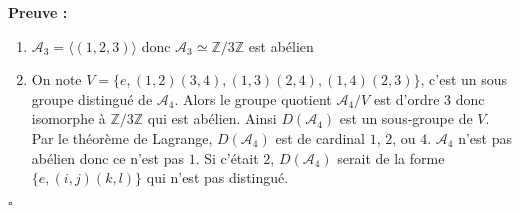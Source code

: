 \documentclass{report}
\renewenvironment{leftbar}{%
  \def\FrameCommand{\vrule width 0.4pt \hspace{10pt}}%
  \MakeFramed {\advance\hsize-\width \FrameRestore}}%
 {\endMakeFramed}%
\newenvironment{preuve}{\vspace*{0.5cm}
    \begin{leftbar}
    \noindent\textbf{Preuve :}\par}{
    \begin{flushright}
    $\square$
    \end{flushright}
    \end{leftbar}
}
\newcommand{\Z}{\mathbb{Z}}
\begin{document}
\begin{preuve}
\begin{enumerate}
\item $\mathcal{A}_3 = \langle (1,2,3) \rangle$ donc $\mathcal{A}_3\simeq \Z/3\Z$ est abélien
\item On note $V = \{e,(1,2)(3,4),(1,3)(2,4),(1,4)(2,3)\}$, c'est un sous groupe distingué de $\mathcal{A}_4$. Alors le groupe quotient $\mathcal{A}_4/V$ est d'ordre 3 donc isomorphe à $\Z/3\Z$ qui est abélien. Ainsi $D(\mathcal{A}_4)$ est un sous-groupe de $V$. Par le théorème de Lagrange, $D(\mathcal{A}_4)$ est de cardinal $1$, $2$, ou $4$. $\mathcal{A}_4$ n'est pas abélien donc ce n'est pas $1$. Si c'était $2$, $D(\mathcal{A}_4)$ serait de la forme $\{e, (i,j)(k,l)\}$ qui n'est pas distingué.
\end{enumerate}
\end{preuve}
\end{document}
